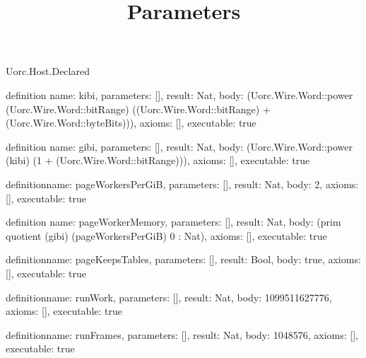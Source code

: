 \begin{lexlean}{Uorc.Host.Declared}
\title{Parameters}
\begin{semanticmodule}
definition{
  name: kibi,
  parameters: [],
  result: Nat,
  body: (Uorc.Wire.Word::power (Uorc.Wire.Word::bitRange) ((Uorc.Wire.Word::bitRange) + (Uorc.Wire.Word::byteBits))),
  axioms: [],
  executable: true
}

definition{
  name: gibi,
  parameters: [],
  result: Nat,
  body: (Uorc.Wire.Word::power (kibi) (1 + (Uorc.Wire.Word::bitRange))),
  axioms: [],
  executable: true
}

definition{name: pageWorkersPerGiB, parameters: [], result: Nat, body: 2, axioms: [], executable: true}

definition{
  name: pageWorkerMemory,
  parameters: [],
  result: Nat,
  body: (prim quotient (gibi) (pageWorkersPerGiB) 0 : Nat),
  axioms: [],
  executable: true
}

definition{name: pageKeepsTables, parameters: [], result: Bool, body: true, axioms: [], executable: true}

definition{name: runWork, parameters: [], result: Nat, body: 1099511627776, axioms: [], executable: true}

definition{name: runFrames, parameters: [], result: Nat, body: 1048576, axioms: [], executable: true}
\end{semanticmodule}
\end{lexlean}
